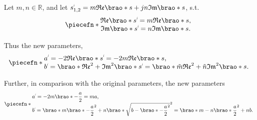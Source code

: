 \documentclass[12pt]{article}
\DeclarePairedDelimiter\brao()%
\DeclarePairedDelimiter\piecefn\{.
\newcommand{\setprime}[2][1]{%
    {#2}^{%
        \raisebox{1pt}{%
            \scalebox{0.5}{%
                \itshape\sffamily\uppercase%
                \expandafter{%
                    \romannumeral#1%
                }%
            }%
        }
    }%
}%
\begin{document}
\begin{enumerate}[(a)]
        Let $m,n \in \mathbb{R}$, and let $\setprime{s}_{1,2} = m\mathfrak{Re}\brao*s + jn\mathfrak{Im}\brao*s$, s.t.
        \begin{equation}
            \piecefn*{
                \begin{matrix}
                    \mathfrak{Re}\brao*{\setprime{s}} = m\mathfrak{Re}\brao*s,
                \\*
                    \mathfrak{Im}\brao*{\setprime{s}} = n\mathfrak{Im}\brao*s.
                \\*
                \end{matrix}
            }
        \end{equation}

        Thus the new parameters,
        \begin{equation}
            \piecefn*{
                \begin{array}{@{}l@{}}\displaystyle
                      \setprime{a}
                    = -2\mathfrak{Re}\brao*{\setprime{s}}
                    = -2m\mathfrak{Re}\brao*s
                    \rlap,
                \\*
                      \setprime{b}
                    = \brao*{\mathfrak{Re}^2 + \mathfrak{Im}^2}\brao*{\setprime{s}}
                    = \brao*{\tilde{m}\mathfrak{Re}^2 + \tilde{n}\mathfrak{Im}^2}\brao*s
                    \rlap.
                \\*
                \end{array}
            }
        \end{equation}

        Further, in comparison with the original parameters,
        the new parameters
        \begin{equation}
            \piecefn*{
                \begin{array}{@{}l@{}}\displaystyle
                      \setprime{a}
                    = -2m\brao*{-\frac{a}2}
                    = ma
                    \rlap,
                \\*\displaystyle
                      \setprime{b}
                    = \brao*{m\brao*{-\frac{a}2}^2 + n\brao*{\sqrt{b - \brao*{-\frac{a}2}^2}}^2}
                    = \brao*{m - n}\brao*{\frac{a}2}^2 + nb
                    \rlap.
                \\*
                \end{array}
            }
        \end{equation}


\end{enumerate}
\end{document}
